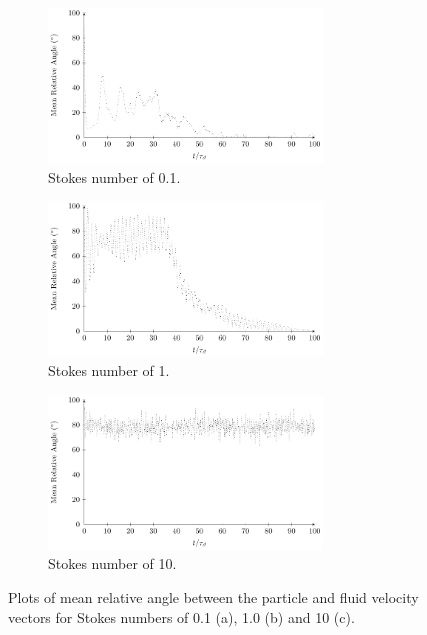 \documentclass[../Interim_Report_Master]{subfiles}
\begin{document}
\begin{figure}[H]
	\centering
	\begin{subfigure}[t]{\textwidth}
		\centering
		\includegraphics[width=0.8\textwidth]{./Diagrams/Statistical_Verification_Test/stk_0_1/Statistical_Verification_Test_Angle_stk_0_1_.pdf}
		\caption{Stokes number of 0.1.}
		\label{rel_ang_stk_0_1}
	\end{subfigure}
	\begin{subfigure}[t]{\textwidth}
		\centering
		\includegraphics[width=0.8\textwidth]{./Diagrams/Statistical_Verification_Test/stk_1/Statistical_Verification_Test_Angle_stk_1.pdf}
		\caption{Stokes number of 1.}
		\label{rel_ang_stk_1}
	\end{subfigure}
	\begin{subfigure}[t]{\textwidth}
		\centering
		\includegraphics[width=0.8\textwidth]{./Diagrams/Statistical_Verification_Test/stk_10/Statistical_Verification_Test_Angle_stk_10.pdf}
		\caption{Stokes number of 10.}
		\label{rel_ang_stk_10}
	\end{subfigure}
	\caption{Plots of mean relative angle between the particle and fluid velocity vectors for Stokes numbers of 0.1 (a), 1.0 (b) and 10 (c).}
	\label{rel_ang}
\end{figure}
\end{document}
